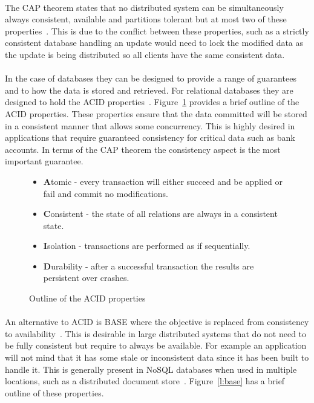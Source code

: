 \documentclass{CRPITStyle}
\renewcommand{\cite}{\citep}
\begin{document}
\paragraph{}
The CAP theorem states that no distributed system can be
simultaneously always consistent, available and
partitions tolerant but at most two of these properties~\cite{base,nosql_db,compare_nosql,nosql_survey}.
This is due to the conflict between these properties, such as a
strictly consistent database handling an update would
need to lock the modified data as the update is being distributed
so all clients have the same consistent data.

\paragraph{}
In the case of databases they can be designed to provide a
range of guarantees and to how the data is stored and retrieved.
For relational databases they are designed to hold
the ACID properties~\cite{relational_db,base}.
Figure~\ref{l:acid} provides a brief outline of the ACID properties.
These properties ensure that the data committed will be stored in a 
consistent manner that allows some concurrency.
This is highly desired in applications that require guaranteed consistency
for critical data such as bank accounts.
In terms of the CAP theorem the consistency aspect is the most important
guarantee.

\begin{figure}
\begin{itemize}
    \item \textbf{A}tomic - every transaction will either
        succeed and be applied or fail and commit no modifications.
    \item \textbf{C}onsistent - the state of all relations are
        always in a consistent state.
    \item \textbf{I}solation - transactions are performed as if sequentially.
    \item \textbf{D}urability - after a successful transaction the results
        are persistent over crashes.
\end{itemize}
    \caption{Outline of the ACID properties~\cite{relational_db,base}}\label{l:acid}
\end{figure}
%


\paragraph{}
An alternative to ACID is BASE where the objective is replaced from consistency
to availability~\cite{nosql_survey}.
This is desirable in large distributed systems that do not need to be
fully consistent but require to always be available.
For example an application will not mind that it has some stale or
inconsistent data since it has been built to handle it.
This is generally present in NoSQL databases when used in multiple
locations, such as a distributed document store~\cite{base}.
Figure~\ref{l:base} has a brief outline of these properties.
\end{document}
